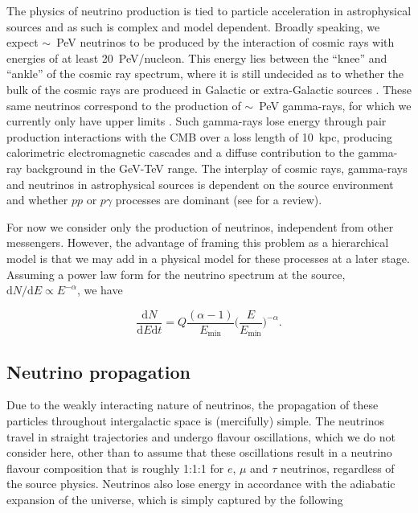 \documentclass[fontsize=12pt]{article}
\begin{document}
The physics of neutrino production is tied to particle acceleration in astrophysical sources and as such is complex and model dependent. Broadly speaking, we expect $\sim$~PeV neutrinos to be produced by the interaction of cosmic rays with energies of at least 20~PeV/nucleon. This energy lies between the ``knee'' and ``ankle'' of the cosmic ray spectrum, where it is still undecided as to whether the bulk of the cosmic rays are produced in Galactic or extra-Galactic sources \cite{Aloisio:2012ff}. These same neutrinos correspond to the production of $\sim$~PeV gamma-rays, for which we currently only have upper limits \cite{Ahlers:2014ks, Aartsen:2013dg}. Such gamma-rays lose energy through pair production interactions with the CMB over a loss length of 10~kpc, producing calorimetric electromagnetic cascades and a diffuse contribution to the gamma-ray background in the GeV-TeV range. The interplay of cosmic rays, gamma-rays and neutrinos in astrophysical sources is dependent on the source environment and whether $pp$ or $p\gamma$ processes are dominant (see \cite{Meszaros:2017hm} for a review).

For now we consider only the production of neutrinos, independent from other messengers. However, the advantage of framing this problem as a hierarchical model is that we may add in a physical model for these processes at a later stage. Assuming a power law form for the neutrino spectrum at the source, $\mathrm{d}N/\mathrm{d}E \propto E^{-\alpha}$, we have

\begin{equation}
\frac{\mathrm{d}N}{\mathrm{d}E\mathrm{d}t} = Q \frac{(\alpha - 1)}{E_\mathrm{min}} \Bigg( \frac{E}{E_\mathrm{min}} \Bigg)^{-\alpha}.
\label{eqn:flux}
\end{equation}

\subsection{Neutrino propagation}

Due to the weakly interacting nature of neutrinos, the propagation of these particles throughout intergalactic space is (mercifully) simple. The neutrinos travel in straight trajectories and undergo flavour oscillations, which we do not consider here, other than to assume that these oscillations result in a neutrino flavour composition that is roughly 1:1:1 for $e$, $\mu$ and $\tau$
 neutrinos, regardless of the source physics. Neutrinos also lose energy in accordance with the adiabatic expansion of the universe, which is simply captured by the following
 
\end{document}
